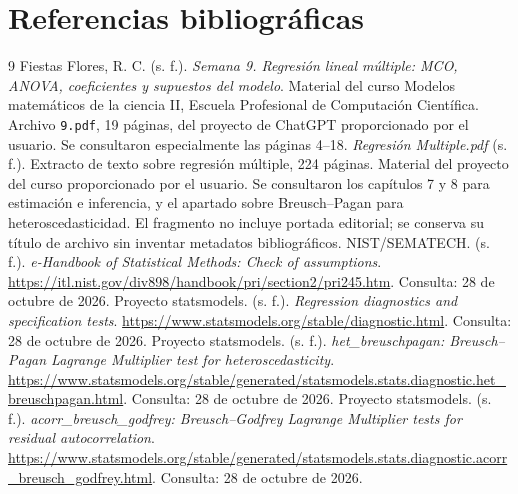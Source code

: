 \documentclass[11pt,a4paper]{article}
\begin{document}
\clearpage\section{Referencias bibliográficas}
\begingroup\raggedright\renewcommand{\section}[2]{}\begin{thebibliography}{9}
 Fiestas Flores, R. C. (s. f.). \emph{Semana 9. Regresión lineal múltiple: MCO, ANOVA, coeficientes y supuestos del modelo}. Material del curso Modelos matemáticos de la ciencia II, Escuela Profesional de Computación Científica. Archivo \texttt{9.pdf}, 19 páginas, del proyecto de ChatGPT proporcionado por el usuario. Se consultaron especialmente las páginas 4--18.
 \emph{Regresión Multiple.pdf} (s. f.). Extracto de texto sobre regresión múltiple, 224 páginas. Material del proyecto del curso proporcionado por el usuario. Se consultaron los capítulos 7 y 8 para estimación e inferencia, y el apartado sobre Breusch--Pagan para heteroscedasticidad. El fragmento no incluye portada editorial; se conserva su título de archivo sin inventar metadatos bibliográficos.
 NIST/SEMATECH. (s. f.). \emph{e-Handbook of Statistical Methods: Check of assumptions}. \url{https://itl.nist.gov/div898/handbook/pri/section2/pri245.htm}. Consulta: 28 de octubre de 2026.
 Proyecto statsmodels. (s. f.). \emph{Regression diagnostics and specification tests}. \url{https://www.statsmodels.org/stable/diagnostic.html}. Consulta: 28 de octubre de 2026.
 Proyecto statsmodels. (s. f.). \emph{het\_breuschpagan: Breusch--Pagan Lagrange Multiplier test for heteroscedasticity}. \url{https://www.statsmodels.org/stable/generated/statsmodels.stats.diagnostic.het_breuschpagan.html}. Consulta: 28 de octubre de 2026.
 Proyecto statsmodels. (s. f.). \emph{acorr\_breusch\_godfrey: Breusch--Godfrey Lagrange Multiplier tests for residual autocorrelation}. \url{https://www.statsmodels.org/stable/generated/statsmodels.stats.diagnostic.acorr_breusch_godfrey.html}. Consulta: 28 de octubre de 2026.
\end{thebibliography}\endgroup

\appendix\newpage
\end{document}
